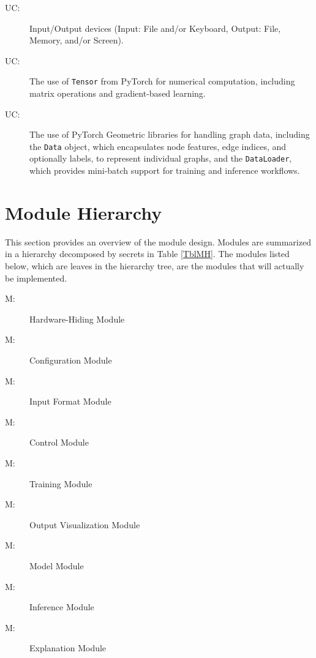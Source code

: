 \documentclass[12pt, titlepage]{article}
\newcounter{ucnum}
\newcommand{\uctheucnum}{UC\theucnum}
\newcounter{mnum}
\newcommand{\mthemnum}{M\themnum}
\begin{document}
\begin{description}
\item[ \uctheucnum \label{ucIO}:] Input/Output devices
  (Input: File and/or Keyboard, Output: File, Memory, and/or Screen).
\item[ \uctheucnum \label{ucI1}:] The use of \texttt{Tensor} from PyTorch for numerical computation, including matrix operations and gradient-based learning.
\item[ \uctheucnum \label{ucI2}:] The use of PyTorch Geometric libraries for handling graph data, including the \texttt{Data} object, which encapsulates node features, edge indices, and optionally labels, to represent individual graphs, and the \texttt{DataLoader}, which provides mini-batch support for training and inference workflows.
\end{description}

\section{Module Hierarchy} \label{SecMH}

This section provides an overview of the module design. Modules are summarized
in a hierarchy decomposed by secrets in Table \ref{TblMH}. The modules listed
below, which are leaves in the hierarchy tree, are the modules that will
actually be implemented.

\begin{description}
\item [ \mthemnum \label{mHH}:]Hardware-Hiding Module
\item [ \mthemnum \label{mConfig}:]Configuration Module
\item [ \mthemnum \label{mInput}:] Input Format Module
\item [ \mthemnum \label{mControl}:] Control Module
\item [ \mthemnum \label{mTrain}:] Training Module
\item [ \mthemnum \label{mVil}:] Output Visualization Module
\item [ \mthemnum \label{mModel}:] Model Module
\item [ \mthemnum \label{mInf}:] Inference Module
\item [ \mthemnum \label{mExp}:] Explanation Module


\end{description}
\end{document}
